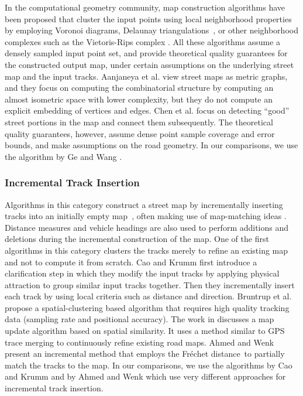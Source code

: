\documentclass[natbib]{svjour3}                    \smartqed  \usepackage[table]{xcolor}
\newcommand{\Frd}{Fr\'echet distance}
\begin{document}
In the computational geometry community, map construction algorithms have been proposed that cluster the input points using local neighborhood properties by employing Voronoi diagrams, Delaunay triangulations~\cite{chen:2010:rnr,DBLP:conf/nips/GeSBW11}, or other neighborhood complexes such as the Vietoris-Rips complex \cite{Aanjaneya:2011}. All these algorithms assume a densely sampled input point set, and provide theoretical quality guarantees for the constructed output map, under certain assumptions on the underlying street map and the input tracks.
Aanjaneya et al. \cite{Aanjaneya:2011} view street maps as metric graphs, and they focus on computing the combinatorial structure by computing an almost isometric space with lower complexity, but they do not compute an explicit embedding of vertices and edges. 
Chen et al. \cite{chen:2010:rnr} focus on detecting ``good'' street portions in the map and connect them subsequently. The theoretical quality guarantees, however, assume dense point sample coverage and error bounds, and make assumptions on the road geometry.
In our comparisons, we use the algorithm by Ge and Wang \cite{DBLP:conf/nips/GeSBW11}. 

\subsubsection{Incremental Track Insertion}
Algorithms in this category construct a street map by incrementally inserting tracks into an initially empty map~\cite{Niehofer:2009:GCM:1590964.1591648}, often making use of map-matching ideas \cite{quddus:2007:cmma}. Distance measures and vehicle headings are also used to perform additions and deletions during the incremental construction of the map.
One of the first algorithms in this category \cite{rogers:1999:mgd} clusters the tracks merely to refine an existing map and not to compute it from scratch. Cao and Krumm \cite{Cao:2009:GTR:1653771.1653776} first introduce a clarification step in which they modify the input tracks by applying physical attraction to group similar input tracks together. Then they incrementally insert each track by using local criteria such as distance and direction. 
Bruntrup et al.~\cite{bruntrup:2005:imgg} propose a spatial-clustering based algorithm that requires high quality tracking data (sampling rate and positional accuracy).
The work in \cite{DBLP:conf/gis/ZhangTS10} discusses a map update algorithm based on spatial similarity. It uses a method similar to GPS trace merging to continuously refine existing road maps.
Ahmed and Wenk \cite{csm_esa2012} present an incremental method that employs the \Frd\ to partially match the tracks to the map. 
In our comparisons, we use the algorithms by Cao and Krumm \cite{Cao:2009:GTR:1653771.1653776} and by Ahmed and Wenk  \cite{csm_esa2012} which use very different approaches for incremental track insertion.
\end{document}
